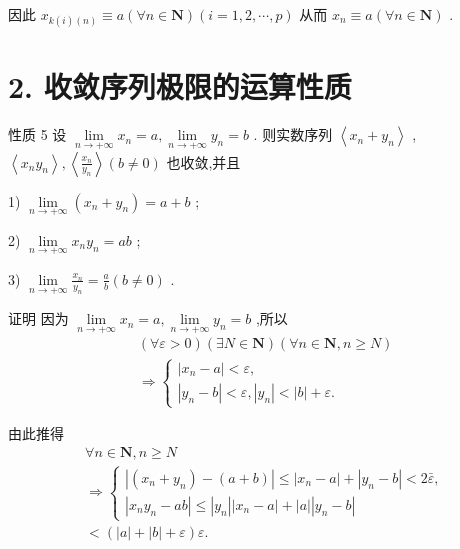 因此 ${x}_{k\left( i\right) \left( n\right) } \equiv  a\left( {\forall n \in  \mathbf{N}}\right) \left( {i = 1,2,\cdots ,p}\right)$ 从而 ${x}_{n} \equiv  a\left( {\forall n \in  \mathbf{N}}\right)$ .

\section*{2. 收敛序列极限的运算性质}

性质 5 设 $\mathop{\lim }\limits_{{n \rightarrow   + \infty }}{x}_{n} = a,\mathop{\lim }\limits_{{n \rightarrow   + \infty }}{y}_{n} = b$ . 则实数序列 $\left\langle  {{x}_{n} + {y}_{n}}\right\rangle$ , $\left\langle  {{x}_{n}{y}_{n}}\right\rangle  ,\left\langle  \frac{{x}_{n}}{{y}_{n}}\right\rangle  \left( {b \neq  0}\right)$ 也收敛,并且

1) $\mathop{\lim }\limits_{{n \rightarrow   + \infty }}\left( {{x}_{n} + {y}_{n}}\right)  = a + b$ ;

2) $\mathop{\lim }\limits_{{n \rightarrow   + \infty }}{x}_{n}{y}_{n} = {ab}$ ;

3) $\mathop{\lim }\limits_{{n \rightarrow   + \infty }}\frac{{x}_{n}}{{y}_{n}} = \frac{a}{b}\left( {b \neq  0}\right)$ .

证明 因为 $\mathop{\lim }\limits_{{n \rightarrow   + \infty }}{x}_{n} = a,\mathop{\lim }\limits_{{n \rightarrow   + \infty }}{y}_{n} = b$ ,所以
\begin{align*}
	&\left( {\forall \varepsilon  > 0}\right) \left( {\exists N \in  \mathbf{N}}\right) \left( {\forall n \in  \mathbf{N},n \geq  N}\right)\\
	&\Rightarrow  \left\{  \begin{array}{l} \left| {{x}_{n} - a}\right|  < \varepsilon , \\  \left| {{y}_{n} - b}\right|  < \varepsilon ,\left| {y}_{n}\right|  < \left| b\right|  + \varepsilon . \end{array}\right.
\end{align*}

由此推得
\begin{align*}
	&\forall n \in  \mathbf{N},n \geq  N\\
	&\Rightarrow  \left\{  \begin{array}{l} \left| {\left( {{x}_{n} + {y}_{n}}\right)  - \left( {a + b}\right) }\right|  \leq  \left| {{x}_{n} - a}\right|  + \left| {{y}_{n} - b}\right|  < 2\bar{\varepsilon }, \\  \left| {{x}_{n}{y}_{n} - {ab}}\right|  \leq  \left| {y}_{n}\right| \left| {{x}_{n} - a}\right|  + \left| a\right| \left| {{y}_{n} - b}\right|  \end{array}\right.\\
	&< \left( {\left| a\right|  + \left| b\right|  + \varepsilon }\right) \varepsilon .
\end{align*}

